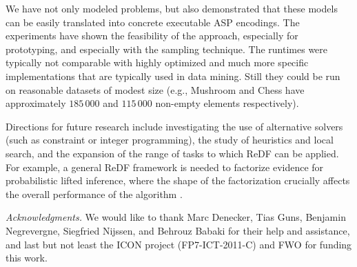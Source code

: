 

We have not only modeled problems, but also demonstrated that these models can be easily 
translated into concrete executable ASP encodings.
The experiments have shown the feasibility of the approach, especially for prototyping, and especially with the sampling technique.
The runtimes were typically not comparable with highly optimized and much more specific implementations that are typically used in data mining. 
Still they could be run on reasonable datasets of modest size (e.g.,  Mushroom and Chess have approximately $185\,000$ and $115\,000$ non-empty elements respectively). 

Directions for future research include investigating the use of alternative solvers (such as constraint or integer programming), the 
  study of heuristics and local search, and the expansion of the range of tasks to which ReDF can be applied. For example, a general ReDF framework is needed to factorize evidence for probabilistic lifted inference, where the shape of the factorization crucially affects the overall performance of the algorithm \citep{DBLP:conf/nips/BroeckD13}.

\textit{Acknowledgments.}  We would like to thank Marc Denecker, Tias Guns, Benjamin Negrevergne, Siegfried Nijssen, and Behrouz Babaki for their help and assistance, and last but not least the ICON project (FP7-ICT-2011-C) and FWO for funding this work.
